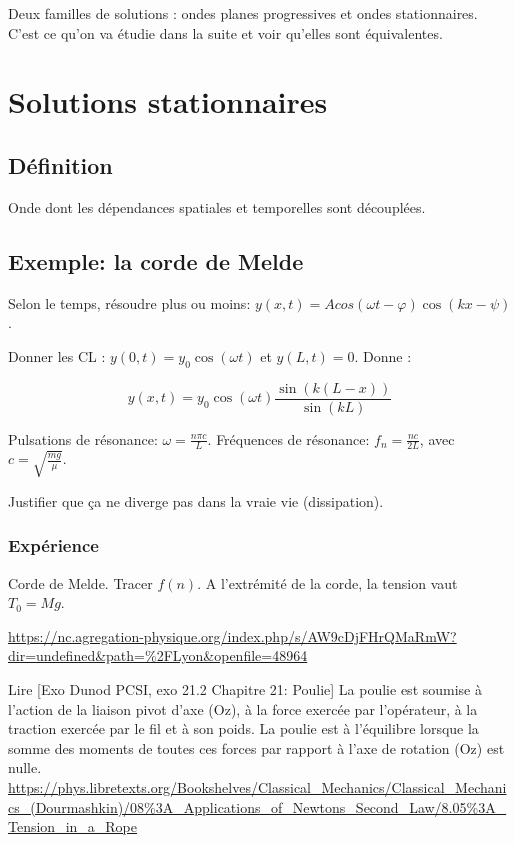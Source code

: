 \documentclass[11pt]{report}
\numberwithin{figure}{section}
\numberwithin{equation}{section}
\numberwithin{table}{section}
\newcommand{\1}{\boldsymbol{1}}
\begin{document}
Deux familles de solutions : ondes planes progressives et ondes stationnaires. C'est ce qu'on va étudie dans la suite et voir qu'elles sont équivalentes.

\section{Solutions stationnaires}

\subsection{Définition}
Onde dont les dépendances spatiales et temporelles sont découplées.


\subsection{Exemple: la corde de Melde}

Selon le temps, résoudre plus ou moins: $y(x,t) = A cos(\omega t - \varphi) \cos(k x -\psi)$.

Donner les CL : $y(0,t) = y_0 \cos(\omega t)$ et $y(L,t) = 0$. Donne :

\begin{equation}
y(x,t) = y_0 \cos(\omega t) \frac{\sin(k(L-x))}{\sin(kL)}
\end{equation}

Pulsations de résonance: $\omega = \frac{n \pi c}{L}$. Fréquences de résonance: $f_n = \frac{n c}{2 L}$, avec $c = \sqrt{\frac{m g}{\mu}}$.

Justifier que ça ne diverge pas dans la vraie vie (dissipation).

\subsubsection{Expérience} Corde de Melde. Tracer $f(n)$. A l'extrémité de la corde, la tension vaut $T_0 = Mg$.

\url{https://nc.agregation-physique.org/index.php/s/AW9cDjFHrQMaRmW?dir=undefined&path=%2FLyon&openfile=48964}

Lire [Exo Dunod PCSI, exo 21.2 Chapitre 21: Poulie] La poulie est soumise à l’action de la liaison pivot d’axe (Oz), à la force exercée par l’opérateur, à la traction exercée par le fil et à son poids. La poulie est à l’équilibre lorsque la somme des
moments de toutes ces forces par rapport à l’axe de rotation (Oz) est nulle. \\

\url{https://phys.libretexts.org/Bookshelves/Classical_Mechanics/Classical_Mechanics_(Dourmashkin)/08%3A_Applications_of_Newtons_Second_Law/8.05%3A_Tension_in_a_Rope}
\end{document}
